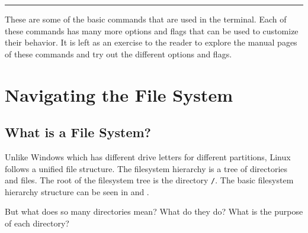 \vspace{5mm}
\hrule
\vspace{3mm}

These are some of the basic commands that are used in the terminal.
Each of these commands has many more options and flags that can be used to customize their behavior.
It is left as an exercise to the reader to explore the manual pages of these commands and try out the different options and flags.


\vfill
\pagebreak
\section{Navigating the File System}

\subsection{What is a File System?}

Unlike Windows which has different drive letters for different partitions, Linux follows a unified file structure. The filesystem hierarchy is a tree of directories and files. The root of the filesystem tree is the directory \lstinline|/|. The basic filesystem hierarchy structure can be seen in  and .

But what does so many directories mean? What do they do? What is the purpose of each directory?

